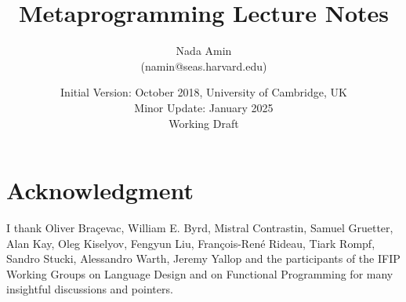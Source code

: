 \documentclass{book}
\begin{document}
%
\setcounter{chapter}{-1}

\title{Metaprogramming Lecture Notes}
\author{Nada Amin\\(namin@seas.harvard.edu)}
\date{Initial Version: October 2018, University of Cambridge, UK\\
Minor Update: January 2025\\
Working Draft
}
\maketitle

\tableofcontents







\nocite{sicp}

\chapter*{Acknowledgment}

I thank Oliver Bra\c{c}evac, William E. Byrd, Mistral Contrastin,
Samuel Gruetter, Alan Kay, Oleg Kiselyov, Fengyun Liu,
Fran\c{c}ois-Ren\'e Rideau, Tiark Rompf, Sandro Stucki, Alessandro
Warth, Jeremy Yallop and the participants of the IFIP Working Groups
on Language Design and on Functional Programming for many insightful
discussions and pointers.

\clearpage


\end{document}
